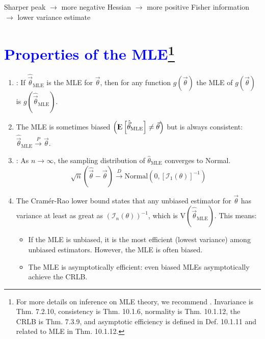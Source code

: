 \documentclass[11pt]{article}
\newcommand{\E}{{\rm I\kern-.3em E}}
\newcommand{\V}{\text{V}}
\newcommand{\bblue}[1]{\textbf{\textcolor{blue}{#1}}}
\newcommand{\bgreen}[1]{\textbf{\color{olive}{#1}}}
\begin{document}
\bgreen{Remember:} Sharper peak $\rightarrow$ more negative Hessian $\rightarrow$ more positive Fisher information $\rightarrow$ lower variance estimate

\section*{\bblue{Properties of the MLE\footnote{For more details on inference on MLE theory, we recommend \citet{casella2002}. Invariance is Thm. 7.2.10, consistency is Thm. 10.1.6, normality is Thm. 10.1.12, the CRLB is Thm. 7.3.9, and asymptotic efficiency is defined in Def. 10.1.11 and related to MLE in Thm. 10.1.12.}}}
\begin{enumerate}
\item \bgreen{Invariance}: If $\hat{\vec\theta}_\text{MLE}$ is the MLE for $\vec\theta$, then for any function $g(\vec\theta)$ the MLE of $g(\vec\theta)$ is $g(\hat{\vec\theta}_\text{MLE})$.
\item \bgreen{Consistency:} The MLE is sometimes biased $\left(\E\left[\hat{\vec\theta}_\text{MLE}\right]\neq \vec\theta\right)$ but is always consistent: $\hat{\vec\theta}_\text{MLE}\stackrel{P}{\rightarrow}\vec\theta$.
\item \bgreen{Asymptotic normality}: As $n\rightarrow\infty$, the sampling distribution of $\hat\theta_\text{MLE}$ converges to Normal.
\vspace{-2ex}$$\sqrt{n}\left(\hat{\vec\theta} - \vec{\theta}\right) \stackrel{D}{\rightarrow} \text{Normal}\left(0,\left[\mathcal{I}_1(\theta)\right]^{-1}\right)$$ \vspace{-6ex}
\item \bgreen{Efficiency:} The Cram\'{e}r-Rao lower bound states that any unbiased estimator for $\vec{\theta}$ has variance at least as great as $\left(\mathcal{I}_n(\theta)\right)^{-1}$, which is $\V\left(\hat{\vec\theta}_\text{MLE}\right)$. This means:
\begin{itemize}
\item If the MLE is unbiased, it is the most efficient (lowest variance) among unbiased estimators. However, the MLE is often biased.
\item The MLE is asymptotically efficient: even biased MLEs asymptotically achieve the CRLB.
\end{itemize}
\end{enumerate}
\end{document}
